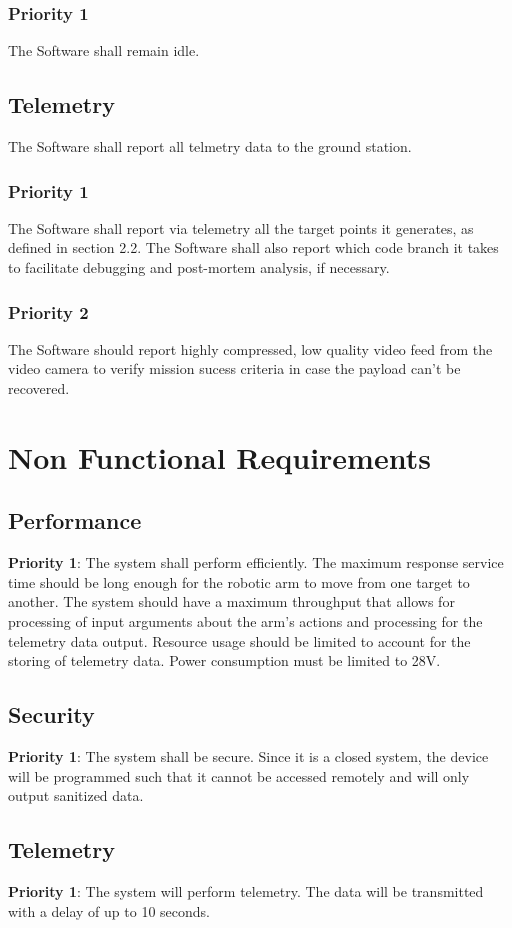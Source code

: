 \documentclass[letterpaper,10pt]{article}
\begin{document}
\subsubsection{Priority 1}
The Software shall remain idle.
\subsection{Telemetry}
The Software shall report all telmetry data to the ground station.
\subsubsection{Priority 1}
The Software shall report via telemetry all the target points it generates, as defined in section 2.2.
The Software shall also report which code branch it takes to facilitate debugging and post-mortem analysis, if necessary.
\subsubsection{Priority 2}
The Software should report highly compressed, low quality video feed from the video camera to verify mission sucess criteria
in case the payload can't be recovered.

\section{Non Functional Requirements}
\subsection{Performance}
\textbf{Priority 1}: The system shall perform efficiently. The maximum response service time should be long enough for the robotic arm to move from one target to another.
 The system should have a maximum throughput that allows for processing of input arguments about the arm's actions and processing for the telemetry data output. 
 Resource usage should be limited to account for the storing of telemetry data. Power consumption must be limited to 28V.
\subsection{Security}
\textbf{Priority 1}: The system shall be secure. Since it is a closed system, the device will be programmed such that it cannot be accessed remotely and will only output sanitized data.
\subsection{Telemetry}
\textbf{Priority 1}: The system will perform telemetry. The data will be transmitted with a delay of up to 10 seconds.
\end{document}
